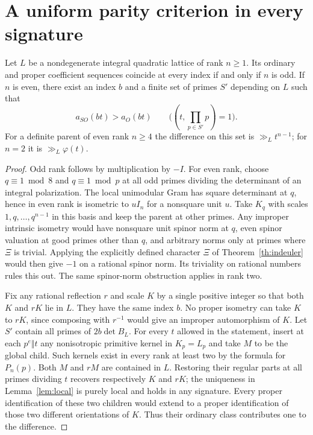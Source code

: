 \section{A uniform parity criterion in every signature}\label{sec:allparity}
\begin{theorem}\label{th:allparity}
Let $L$ be a nondegenerate integral quadratic lattice of rank $n\ge1$. Its ordinary and proper coefficient sequences coincide at every index if and only if $n$ is odd. If $n$ is even, there exist an index \(b\) and a finite set of primes \(S'\) depending on $L$ such that
\[
 a_{SO}(bt)>a_O(bt)\qquad\bigl((t,\prod_{p\in S'}p)=1\bigr).
\]
For a definite parent of even rank \(n\ge4\) the difference on this set is \(\gg_L t^{n-1}\); for \(n=2\) it is \(\gg_L\varphi(t)\).
\end{theorem}
\begin{proof}
Odd rank follows by multiplication by \(-I\). For even rank, choose \(q\equiv1\bmod 8\) and \(q\equiv1\bmod p\) at all odd primes dividing the determinant of an integral polarization. The local unimodular Gram has square determinant at \(q\), hence in even rank is isometric to \(uI_n\) for a nonsquare unit \(u\). Take \(K_q\) with scales \(1,q,\ldots,q^{n-1}\) in this basis and keep the parent at other primes. Any improper intrinsic isometry would have nonsquare unit spinor norm at \(q\), even spinor valuation at good primes other than \(q\), and arbitrary norms only at primes where \(\Xi\) is trivial. Applying the explicitly defined character \(\Xi\) of Theorem~\ref{th:indeuler} would then give \(-1\) on a rational spinor norm. Its triviality on rational numbers rules this out. The same spinor-norm obstruction applies in rank two.

Fix any rational reflection \(r\) and scale \(K\) by a single positive integer so that both \(K\) and \(rK\) lie in \(L\). They have the same index \(b\). No proper isometry can take \(K\) to \(rK\), since composing with \(r^{-1}\) would give an improper automorphism of \(K\). Let \(S'\) contain all primes of \(2b\det B_L\). For every \(t\) allowed in the statement, insert at each \(p^e\Vert t\) any nonisotropic primitive kernel in \(K_p=L_p\) and take \(M\) to be the global child. Such kernels exist in every rank at least two by the formula for \(P_n(p)\). Both \(M\) and \(rM\) are contained in \(L\). Restoring their regular parts at all primes dividing \(t\) recovers respectively \(K\) and \(rK\); the uniqueness in Lemma~\ref{lem:local} is purely local and holds in any signature. Every proper identification of these two children would extend to a proper identification of those two different orientations of \(K\). Thus their ordinary class contributes one to the difference.


\end{proof}
